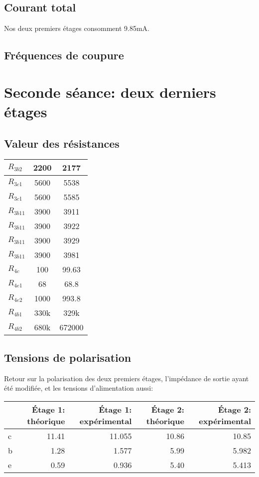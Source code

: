 \subsection{Courant total}
Nos deux premiers étages consomment 9.85mA.

\subsection{Fréquences de coupure}

\section{Seconde séance: deux derniers étages}

\subsection{Valeur des résistances}
\begin{tabular}{|l|c|c|}
    \hline
    $R_{3b2}$ & 2200 & 2177 \\
    \hline
    $R_{3c1}$ & 5600 & 5538 \\
    \hline
    $R_{3c1}$ & 5600 & 5585 \\
    \hline
    $R_{3b11}$ & 3900 & 3911 \\
    \hline
    $R_{3b11}$ & 3900 & 3922 \\
    \hline
    $R_{3b11}$ & 3900 & 3929 \\
    \hline
    $R_{3b11}$ & 3900 & 3981 \\
    \hline
    \hline
    $R_{4c}$ & 100 & 99.63 \\
    \hline
    $R_{4e1}$ & 68 & 68.8 \\
    \hline
    $R_{4e2}$ & 1000 & 993.8 \\
    \hline
    $R_{4b1}$ & 330k & 329k \\
    \hline
    $R_{4b2}$ & 680k & 672000 \\
    \hline
\end{tabular}

\subsection{Tensions de polarisation}
Retour sur la polarisation des deux premiers étages, l’impédance de sortie ayant été modifiée, et les tensions d’alimentation aussi:

\begin{tabular}{|l|r|r|r|r|}
    \hline
    & Étage 1: théorique & Étage 1: expérimental & Étage 2: théorique & Étage 2: expérimental \\
    \hline
    c & 11.41 & 11.055 & 10.86 & 10.85 \\
    \hline
    b &  1.28 & 1.577  &  5.99 & 5.982 \\
    \hline
    e &  0.59 & 0.936  &  5.40 & 5.413 \\
    \hline
\end{tabular}

